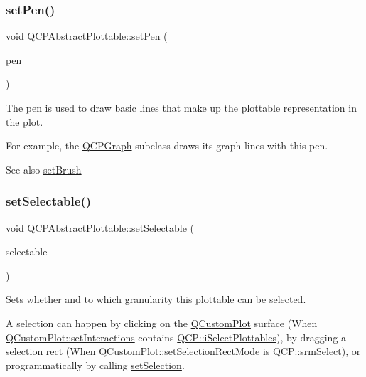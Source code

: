\subsubsection{\texorpdfstring{set\+Pen()}{setPen()}}
{\footnotesize\ttfamily void Q\+C\+P\+Abstract\+Plottable\+::set\+Pen (\begin{DoxyParamCaption}\item[{const Q\+Pen \&}]{pen }\end{DoxyParamCaption})}

The pen is used to draw basic lines that make up the plottable representation in the plot.

For example, the \hyperlink{class_q_c_p_graph}{Q\+C\+P\+Graph} subclass draws its graph lines with this pen.

\begin{DoxySeeAlso}{See also}
\hyperlink{class_q_c_p_abstract_plottable_a7a4b92144dca6453a1f0f210e27edc74}{set\+Brush} 
\end{DoxySeeAlso}
\mbox{\label{class_q_c_p_abstract_plottable_ac238d6e910f976f1f30d41c2bca44ac3}} 
\subsubsection{\texorpdfstring{set\+Selectable()}{setSelectable()}}
{\footnotesize\ttfamily void Q\+C\+P\+Abstract\+Plottable\+::set\+Selectable (\begin{DoxyParamCaption}\item[{\hyperlink{namespace_q_c_p_ac6cb9db26a564b27feda362a438db038}{Q\+C\+P\+::\+Selection\+Type}}]{selectable }\end{DoxyParamCaption})}

Sets whether and to which granularity this plottable can be selected.

A selection can happen by clicking on the \hyperlink{class_q_custom_plot}{Q\+Custom\+Plot} surface (When \hyperlink{class_q_custom_plot_a5ee1e2f6ae27419deca53e75907c27e5}{Q\+Custom\+Plot\+::set\+Interactions} contains \hyperlink{namespace_q_c_p_a2ad6bb6281c7c2d593d4277b44c2b037a67148c8227b4155eca49135fc274c7ec}{Q\+C\+P\+::i\+Select\+Plottables}), by dragging a selection rect (When \hyperlink{class_q_custom_plot_a810ef958ebe84db661c7288b526c0deb}{Q\+Custom\+Plot\+::set\+Selection\+Rect\+Mode} is \hyperlink{namespace_q_c_p_ac9aa4d6d81ac76b094f9af9ad2d3aacfa62c286e8da283a0cbb88ecac2f3f7506}{Q\+C\+P\+::srm\+Select}), or programmatically by calling \hyperlink{class_q_c_p_abstract_plottable_a219bc5403a9d85d3129165ec3f5ae436}{set\+Selection}.

